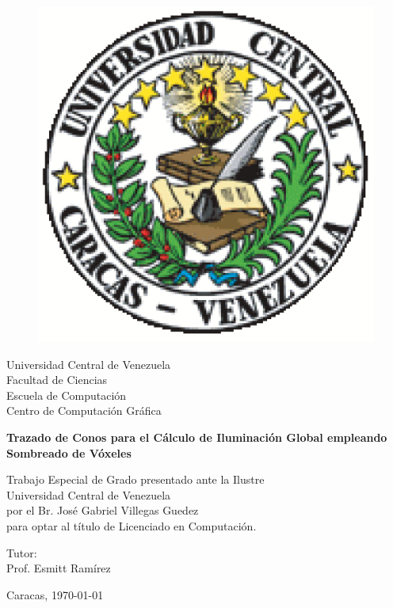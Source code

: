 \label{ch:portada}
\thispagestyle{empty}

\begin{figure}[t]
    \centering
    \includegraphics[height=0.15\textwidth]{media/ucv.eps}
\end{figure}

\begin{center}
	Universidad Central de Venezuela\\
	Facultad de Ciencias\\
	Escuela de Computaci\'on\\
	Centro de Computaci\'on Gr\'afica\\
\end{center}
				
\vspace{2.5cm}

\begin{center}
	\large{\textbf{Trazado de Conos para el Cálculo de Iluminación Global empleando Sombreado de Vóxeles}}
\end{center}
				
\vspace{1.5cm}

\begin{center}
    Trabajo Especial de Grado presentado ante la Ilustre\\
    Universidad Central de Venezuela \\
    por el Br. José Gabriel Villegas Guedez\\
    para optar al título de Licenciado en Computación.
\end{center}

\vspace{1.5cm}				
				
\begin{center}
	Tutor:\\
	Prof. Esmitt Ramírez
\end{center}
				
\vspace{1.0cm}

\begin{center}
	Caracas, \monthyeardate\today
\end{center}
						